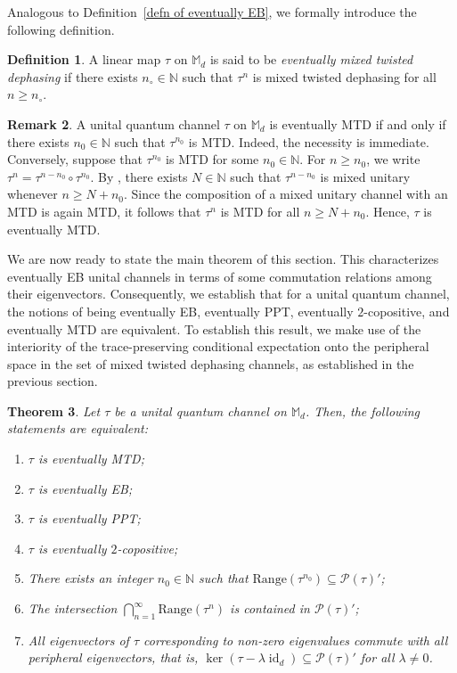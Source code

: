 \documentclass[11pt,reqno]{amsart}
\theoremstyle{definition}
\newtheorem{defn}{Definition}[section]
\newtheorem{rmk}[defn]{Remark}
\theoremstyle{plain}
\newtheorem{thm}[defn]{Theorem}
\theoremstyle{remark}
\numberwithin{equation}{section}%
\begin{document}
Analogous to Definition~\ref{defn of eventually EB}, we formally introduce the following definition.


\begin{defn}
	A linear map $\tau$ on $\mathbb{M}_d$ is said to be \textit{eventually mixed twisted dephasing} if there exists $n_\circ\in\mathbb{N}$ such that $\tau^n$ is mixed twisted dephasing for all $n \ge n_\circ$. 
\end{defn}


\begin{rmk}
A unital quantum channel $\tau$ on $\mathbb{M}_d$ is eventually MTD if and only if there exists $n_0\in\mathbb{N}$ such that $\tau^{n_0}$ is MTD. Indeed, the necessity is immediate. Conversely, suppose that $\tau^{n_0}$ is MTD for some $n_0\in\mathbb{N}$. For $n\geq n_0$, we write $\tau^n=\tau^{n-n_0}\circ\tau^{n_0}$. By \cite[Theorem 3.9]{BD}, there exists $N\in\mathbb{N}$ such that $\tau^{n-n_0}$ is mixed unitary whenever $n\geq N+n_0$. Since the composition of a mixed unitary channel with an MTD is again MTD, it follows that $\tau^n$ is MTD for all $n\geq N+n_0$. Hence, $\tau$ is eventually MTD.
\end{rmk}

We are now ready to state the main theorem of this section. This characterizes eventually EB unital channels in terms of some commutation relations among their eigenvectors. Consequently, we establish that for a unital quantum channel, the notions of being eventually EB, eventually PPT, eventually $2$-copositive, and eventually MTD are equivalent. To establish this result, we make use of the interiority of the trace-preserving conditional expectation onto the peripheral space in the set of mixed twisted dephasing channels, as established in the previous section.



\begin{thm}\label{EMD:thm5}
	Let $\tau$ be a unital quantum channel on $\mathbb{M}_d$. Then, the following statements are equivalent:
	\begin{enumerate}
		\item $\tau$ is eventually MTD;
		\item $\tau$ is eventually EB;
		\item $\tau$ is eventually PPT;
		\item $\tau$ is eventually $2$-copositive;
		\item There exists an integer $n_0 \in \mathbb{N}$ such that $\text{Range}(\tau^{n_0}) \subseteq \mathcal{P}(\tau)'$;
        \item The intersection $\bigcap_{n=1}^\infty \text{Range}(\tau^n)$ is contained in $\mathcal{P}(\tau)'$;
        \item All eigenvectors of $\tau$ corresponding to  non-zero eigenvalues commute with all peripheral eigenvectors, that is, $\ker(\tau - \lambda\operatorname{id}_d)\subseteq \mathcal{P}(\tau)'$ for all $\lambda \neq 0$. 
	\end{enumerate}
\end{thm}
\end{document}
